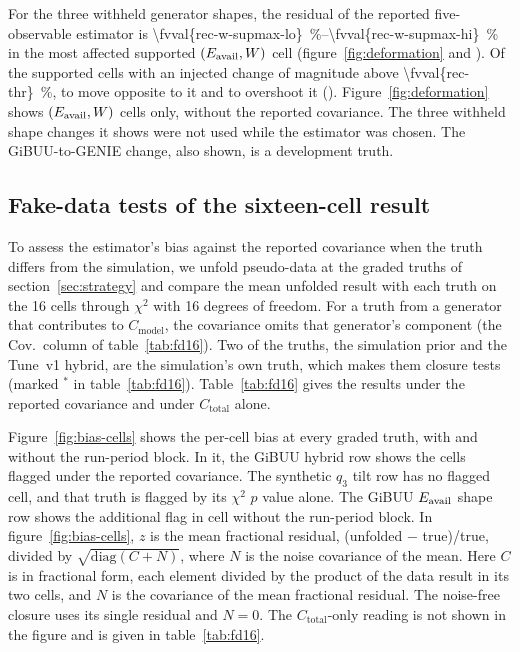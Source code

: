 For the three withheld generator shapes, the residual of the reported five-observable estimator is \SIrange{\fvval{rec-w-supmax-lo}}{\fvval{rec-w-supmax-hi}}{\percent} in the most affected supported $(E_{\mathrm{avail}},W)$ cell (figure~\ref{fig:deformation} and ). Of the supported cells with an injected change of magnitude above \SI{\fvval{rec-thr}}{\percent},  to  move opposite to it and  to  overshoot it (). Figure~\ref{fig:deformation} shows $(E_{\mathrm{avail}},W)$ cells only, without the reported covariance. The three withheld shape changes it shows were not used while the estimator was chosen. The GiBUU-to-GENIE change, also shown, is a development truth.

\subsection{Fake-data tests of the sixteen-cell result}
\label{sec:fd16}
\label{sec:vhalf}

To assess the estimator's bias against the reported covariance when the truth differs from the simulation, we unfold pseudo-data at the  graded truths of section~\ref{sec:strategy} and compare the mean unfolded result with each truth on the 16 cells through $\chi^2$ with 16 degrees of freedom. For a truth from a generator that contributes to $C_{\mathrm{model}}$, the covariance omits that generator's component (the Cov.\ column of table~\ref{tab:fd16}). Two of the truths, the simulation prior and the Tune~v1 hybrid, are the simulation's own truth, which makes them closure tests (marked $^{*}$ in table~\ref{tab:fd16}). Table~\ref{tab:fd16} gives the results under the reported covariance and under $C_{\mathrm{total}}$ alone.

Figure~\ref{fig:bias-cells} shows the per-cell bias at every graded truth, with and without the run-period block. In it, the GiBUU hybrid row shows the cells flagged under the reported covariance. The synthetic $q_3$ tilt row has no flagged cell, and that truth is flagged by its $\chi^2$ $p$ value alone. The GiBUU $E_{\mathrm{avail}}$ shape row shows the additional flag in cell  without the run-period block. In figure~\ref{fig:bias-cells}, $z$ is the mean fractional residual, (unfolded $-$ true)/true, divided by $\sqrt{\mathrm{diag}(C+N)}$, where $N$ is the noise covariance of the mean. Here $C$ is in fractional form, each element divided by the product of the data result in its two cells, and $N$ is the covariance of the mean fractional residual. The noise-free closure uses its single residual and $N=0$. The $C_{\mathrm{total}}$-only reading is not shown in the figure and is given in table~\ref{tab:fd16}.

